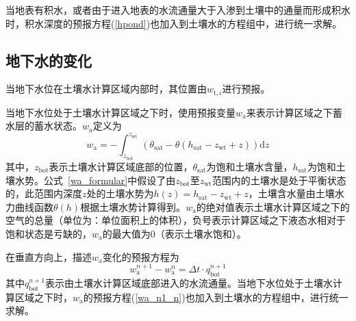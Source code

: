 当地表有积水，或者由于进入地表的水流通量大于入渗到土壤中的通量而形成积水时，积水深度的预报方程(\ref{hpond})也加入到土壤水的方程组中，进行统一求解。


\subsection{地下水的变化}
当地下水位在土壤水计算区域内部时，其位置由$w_{\mathrm{t},i}$进行预报。

当地下水位处于土壤水计算区域之下时，使用预报变量$w_{\mathrm {a}} $来表示计算区域之下蓄水层的蓄水状态。$w_{\mathrm {a}} $定义为
\begin{equation} \label{wa_formular}
  w_{\mathrm{a}}=-\int_{z_{\mathrm{bot}}}^{z_{\mathrm{wt}}}\left(\theta_{\mathrm{sat}}-\theta\left(h_{\mathrm{sat}}-z_{\mathrm{wt}}+z\right)\right){\mathrm { d}} z
\end{equation}
其中，$z_{\mathrm{bot}}$表示土壤水计算区域底部的位置，$\theta_{\mathrm {sat}} $为饱和土壤水含量，$h_{\mathrm {sat}} $为饱和土壤水势。公式~\eqref{wa_formular}中假设了由$z_{\mathrm{bot}}$至$z_{\mathrm{wt}}$范围内的土壤水是处于平衡状态的，此范围内深度$z$处的土壤水势为$h\left(z\right)=h_{\mathrm{sat}}-z_{\mathrm{wt}}+z$，土壤含水量由土壤水力曲线函数$\theta(h)$根据土壤水势计算得到。$w_{\mathrm {a}} $的绝对值表示土壤水计算区域之下的空气的总量（单位为：单位面积上的体积），负号表示计算区域之下液态水相对于饱和状态是亏缺的，$w_{\mathrm {a}} $的最大值为0（表示土壤水饱和）。

在垂直方向上，描述$w_{\mathrm {a}} $变化的预报方程为
\begin{equation}\label{wa_n1_n}
  w_{\mathrm{a}}^{n+1}-w_{\mathrm{a}}^{n}=\Delta t \cdot q_{\mathrm{bot}}^{n+1}
\end{equation}
其中$q_{\mathrm{bot}}^{n+1}$表示由土壤水计算区域底部进入的水流通量。当地下水位处于土壤水计算区域之下时，$w_{\mathrm {a}} $的预报方程(\ref{wa_n1_n})也加入到土壤水的方程组中，进行统一求解。

